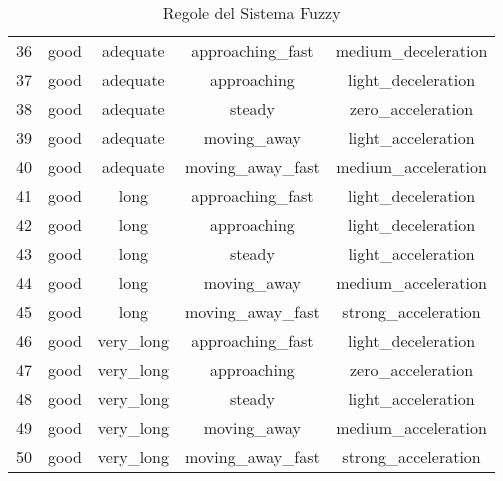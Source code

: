 \begin{table}[!htbp]
{\begin{tabular}{|c|c|c|c|c|}
            36 & good & adequate    & approaching\_fast     & medium\_deceleration \\
            37 & good & adequate    & approaching          & light\_deceleration \\
            38 & good & adequate    & steady               & zero\_acceleration \\
            39 & good & adequate    & moving\_away         & light\_acceleration \\
            40 & good & adequate    & moving\_away\_fast   & medium\_acceleration \\
            41 & good & long        & approaching\_fast     & light\_deceleration \\
            42 & good & long        & approaching          & light\_deceleration \\
            43 & good & long        & steady               & light\_acceleration \\
            44 & good & long        & moving\_away         & medium\_acceleration \\
            45 & good & long        & moving\_away\_fast   & strong\_acceleration \\
            46 & good & very\_long  & approaching\_fast     & light\_deceleration \\
            47 & good & very\_long  & approaching          & zero\_acceleration \\
            48 & good & very\_long  & steady               & light\_acceleration \\
            49 & good & very\_long  & moving\_away         & medium\_acceleration \\
            50 & good & very\_long  & moving\_away\_fast   & strong\_acceleration \\
            \hline
    \end{tabular}
    }
    \caption{Regole del Sistema Fuzzy}
    \label{tab:regole_fuzzy}
\end{table}
